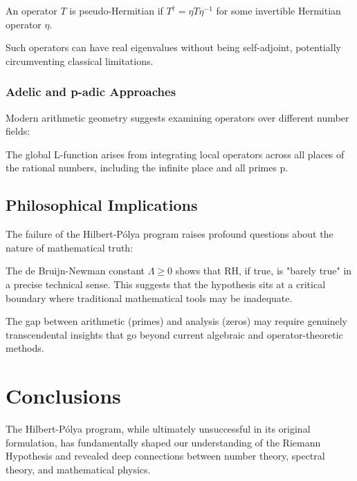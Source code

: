 \begin{definition}
An operator $T$ is pseudo-Hermitian if $T^\dagger = \eta T \eta^{-1}$ for some invertible Hermitian operator $\eta$.
\end{definition}

Such operators can have real eigenvalues without being self-adjoint, potentially circumventing classical limitations.

\subsubsection{Adelic and p-adic Approaches}
Modern arithmetic geometry suggests examining operators over different number fields:

\begin{conjecture}
The global L-function arises from integrating local operators across all places of the rational numbers, including the infinite place and all primes p.
\end{conjecture}

\subsection{Philosophical Implications}

The failure of the Hilbert-Pólya program raises profound questions about the nature of mathematical truth:

\begin{remark}
The de Bruijn-Newman constant $\Lambda \geq 0$ shows that RH, if true, is "barely true" in a precise technical sense. This suggests that the hypothesis sits at a critical boundary where traditional mathematical tools may be inadequate.
\end{remark}

\begin{remark}
The gap between arithmetic (primes) and analysis (zeros) may require genuinely transcendental insights that go beyond current algebraic and operator-theoretic methods.
\end{remark}

\section{Conclusions}
\label{sec:hp_conclusions}

The Hilbert-Pólya program, while ultimately unsuccessful in its original formulation, has fundamentally shaped our understanding of the Riemann Hypothesis and revealed deep connections between number theory, spectral theory, and mathematical physics.

